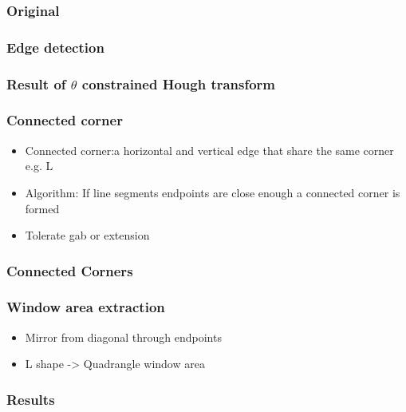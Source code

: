 \documentclass{beamer}
\begin{document}
\frame
{
	\frametitle{Original}
}

\frame
{
	\frametitle{Edge detection}
}

\frame
{
	\frametitle{Result of $\theta$ constrained Hough transform}
}

\frame
{
	\frametitle{Connected corner}
	\begin{itemize}
	\item <+-| alert@+> Connected corner:a horizontal and vertical edge that share the same
	corner e.g. L
	\item <+-| alert@+> Algorithm: If line segments endpoints are close enough a connected corner is formed
	\item <+-| alert@+> Tolerate gab or extension
	\end{itemize}
}

\frame
{
	\frametitle{Connected Corners}

}

\frame
{
	\frametitle{Window area extraction}
	\begin{itemize}
	\item <+-| alert@+> Mirror from diagonal through endpoints
	\item <+-| alert@+> L shape -> Quadrangle window area
	\end{itemize}
}

\frame
{
	\frametitle{Results}
}
\end{document}
